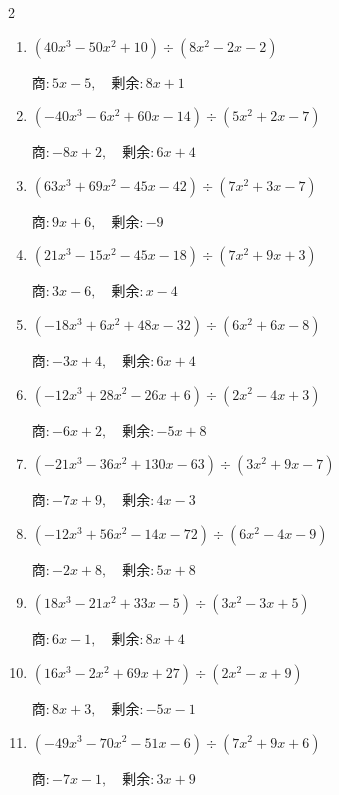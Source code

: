 \begin{multicols}{2}
\begin{enumerate}
        $商 : 4x+8, \quad 剰余 : -5x+1$

\columnbreak %

  \item $(40x^{3}-50x^{2}+10) \div (8x^{2}-2x-2)$

        $商 : 5x-5, \quad 剰余 : 8x+1$

  \item $(-40x^{3}-6x^{2}+60x-14) \div (5x^{2}+2x-7)$

        $商 : -8x+2, \quad 剰余 : 6x+4$

  \item $(63x^{3}+69x^{2}-45x-42) \div (7x^{2}+3x-7)$

        $商 : 9x+6, \quad 剰余 : -9$

  \item $(21x^{3}-15x^{2}-45x-18) \div (7x^{2}+9x+3)$

        $商 : 3x-6, \quad 剰余 : x-4$

  \item $(-18x^{3}+6x^{2}+48x-32) \div (6x^{2}+6x-8)$

        $商 : -3x+4, \quad 剰余 : 6x+4$

\columnbreak %

\resetques

  \item $(-12x^{3}+28x^{2}-26x+6) \div (2x^{2}-4x+3)$

        $商 : -6x+2, \quad 剰余 : -5x+8$

  \item $(-21x^{3}-36x^{2}+130x-63) \div (3x^{2}+9x-7)$

        $商 : -7x+9, \quad 剰余 : 4x-3$

  \item $(-12x^{3}+56x^{2}-14x-72) \div (6x^{2}-4x-9)$

        $商 : -2x+8, \quad 剰余 : 5x+8$

  \item $(18x^{3}-21x^{2}+33x-5) \div (3x^{2}-3x+5)$

        $商 : 6x-1, \quad 剰余 : 8x+4$

  \item $(16x^{3}-2x^{2}+69x+27) \div (2x^{2}-x+9)$

        $商 : 8x+3, \quad 剰余 : -5x-1$

\columnbreak %

  \item $(-49x^{3}-70x^{2}-51x-6) \div (7x^{2}+9x+6)$

        $商 : -7x-1, \quad 剰余 : 3x+9$


\end{enumerate}
\end{multicols}
